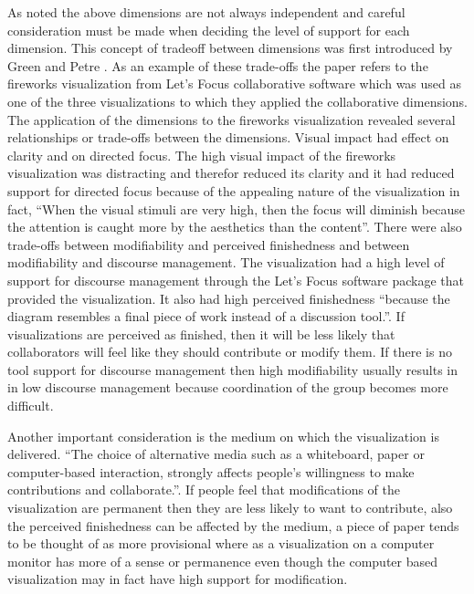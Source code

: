 \documentclass{sig-alternate}
\begin{document}
  As noted the above dimensions are not always independent and careful
  consideration must be made when deciding the level of support for each
  dimension. This concept of tradeoff between dimensions was first introduced
  by Green and Petre \cite{Green:1996:UsabilityAnalysisOfVisualProgrammingEnvironments}. 
  As an example of these trade-offs the paper refers to the fireworks
  visualization from Let's Focus collaborative software which was used as one of
  the three visualizations to which they applied the collaborative dimensions. 
  The application of the dimensions to the fireworks visualization revealed
  several relationships or trade-offs between the dimensions. Visual impact had
  effect on clarity and on directed focus. The high visual impact of the
  fireworks visualization was distracting and therefor reduced its clarity and
  it had reduced support for directed focus because of the appealing nature of
  the visualization in fact, ``When the visual stimuli are very high, then the
  focus will diminish because the attention is caught more by the aesthetics
  than the content''\cite{Bresciani:ACollaborativeDimensionsFramework}. There
  were also trade-offs between modifiability and perceived finishedness and 
  between modifiability
 and discourse management. The visualization had a high level of support for
  discourse management through the Let's Focus software package that provided
  the visualization. It also had high perceived finishedness ``because the
  diagram resembles a final piece of work instead of a discussion
  tool.''\cite{Bresciani:ACollaborativeDimensionsFramework}. If visualizations
  are perceived as finished, then it will be less likely that collaborators will
  feel like they should contribute or modify them. If there is no tool support
  for discourse management then high modifiability usually results in in low
  discourse management because coordination of the group becomes more difficult.

  
  Another important consideration is the medium on which the visualization is
  delivered.  ``The choice of alternative media such as a whiteboard, paper or
  computer-based interaction, strongly affects people's willingness to make
  contributions and
  collaborate.''\cite{Bresciani:ACollaborativeDimensionsFramework}. If people
  feel that modifications of the visualization are permanent then they are less
  likely to want to contribute, also the perceived finishedness can be affected
  by the medium, a piece of paper tends to be thought of as more provisional
  where as a visualization on a computer monitor has more of a sense or
  permanence even though the computer based visualization may in fact have high
  support for modification.
\end{document}
